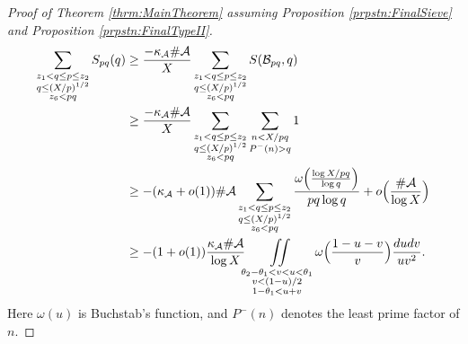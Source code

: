 \documentclass[10pt]{amsart}
\theoremstyle{plain}
\numberwithin{sblmm}{thrm}
\numberwithin{equation}{section}
\begin{document}
\begin{proof}[Proof of Theorem \ref{thrm:MainTheorem} assuming Proposition \ref{prpstn:FinalSieve} and Proposition \ref{prpstn:FinalTypeII}]
%
\begingroup
\allowdisplaybreaks
\begin{align}
\sum_{\substack{z_1<q\le p\le z_2\\ q\le (X/p)^{1/2}\\  z_6<p q}}S_{p q}(q)
&\ge \frac{-\kappa_{\mathcal{A}}\#\mathcal{A}}{X}\sum_{\substack{z_1<q\le p\le z_2\\ q\le (X/p)^{1/2}\\  z_6<p q}}S(\mathcal{B}_{p q},q)\nonumber\\
&\ge  \frac{-\kappa_{\mathcal{A}}\#\mathcal{A}}{X}\sum_{\substack{z_1<q\le p\le z_2\\ q\le (X/p)^{1/2}\\  z_6<p q}}\sum_{\substack{n<X/p q\\ P^-(n)>q}}1\nonumber\\
&\ge  -(\kappa_{\mathcal{A}}+o(1))\#\mathcal{A}\sum_{\substack{z_1<q\le p\le z_2\\ q\le (X/p)^{1/2}\\  z_6<p q}}\frac{\omega\Bigl(\frac{\log{X/p q}}{\log{q}}\Bigr)}{p q \log{q} }+o\Bigl(\frac{\#\mathcal{A}}{\log{X}}\Bigr)\nonumber\\
&\ge -(1+o(1))\frac{\kappa_{\mathcal{A}}\#\mathcal{A}{}}{\log{X}}\iint\limits_{\substack{\theta_2-\theta_1<v<u<\theta_1\\ v<(1-u)/2\\ 1-\theta_1<u+v}}
\omega\Bigl( \frac{1-u-v}{v}\Bigr)\frac{d u d v}{u v^2}.
\label{eq:I1}
\end{align}
\endgroup
%
Here $\omega(u)$ is Buchstab's function, and $P^-(n)$ denotes the least prime factor of $n$.%


\end{proof}
\end{document}
